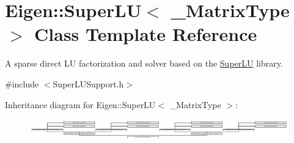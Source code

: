 \hypertarget{class_eigen_1_1_super_l_u}{}\section{Eigen\+:\+:Super\+LU$<$ \+\_\+\+Matrix\+Type $>$ Class Template Reference}
\label{class_eigen_1_1_super_l_u}


A sparse direct LU factorization and solver based on the \hyperlink{class_eigen_1_1_super_l_u}{Super\+LU} library.  




{\ttfamily \#include $<$Super\+L\+U\+Support.\+h$>$}

Inheritance diagram for Eigen\+:\+:Super\+LU$<$ \+\_\+\+Matrix\+Type $>$\+:\begin{figure}[H]
\begin{center}
\leavevmode
\includegraphics[height=0.918635cm]{class_eigen_1_1_super_l_u}
\end{center}
\end{figure}
